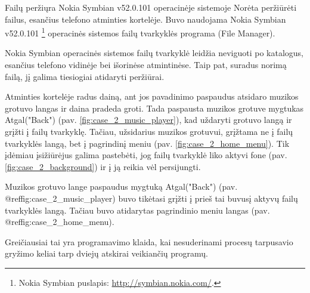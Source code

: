 \begin{xcase}{Failų peržiųra Nokia Symbian v52.0.101 operacinėje sistemoje}
  \xcgoal
  {
    Norėta peržiūrėti failus, esančius telefono atminties kortelėje. 
    Buvo naudojama Nokia Symbian v52.0.101 \footnote{Nokia Symbian puslapis: \url{http://symbian.nokia.com/}.} 
    operacinės sistemos failų tvarkyklės programa (File Manager). 
  }
  
  \xctools
  {
    Nokia Symbian operacinės sistemos failų tvarkyklė leidžia neviguoti po
	katalogus, esančius telefono vidinėje bei išorinėse atmintinėse. Taip 
	pat, suradus norimą failą, jį galima tiesiogiai atidaryti peržiūrai.
  }
  
  \xcresult
  {
    Atminties kortelėje radus dainą, ant jos pavadinimo paspaudus atsidaro muzikos
    grotuvo langas ir daina pradeda groti. Tada paspausta muzikos grotuve mygtukas 
    Atgal("Back") (pav. \ref{fig:case_2_music_player}), kad uždaryti grotuvo langą 
    ir grįžti į failų tvarkyklę. Tačiau, užsidarius muzikos grotuvui, grįžtama ne į
    failų tvarkyklės langą, bet į pagrindinį meniu (pav. \ref{fig:case_2_home_menu}). 
    Tik įdėmiau įsižiūrėjus galima pastebėti, jog failų tvarkyklė liko aktyvi fone 
    (pav. \ref{fig:case_2_background}) ir į ją reikia vėl persijungti.
	
    {
    }
  }
  
  \xcprinciples
  {
    {
      Muzikos grotuvo lange paspaudus mygtuką Atgal("Back") (pav. @ref{fig:case_2_music_player}) buvo tikėtasi grįžti 
      į prieš tai buvusį aktyvų failų tvarkyklės langą. Tačiau buvo atidarytas 
      pagrindinio meniu langas (pav. @ref{fig:case_2_home_menu}).
    }
  }
  
  \xcthoughts
  {
    Greičiausiai tai yra programavimo klaida, kai nesuderinami procesų tarpusavio gryžimo keliai
    tarp dviejų atskirai veikiančių programų.
  }
\end{xcase}

